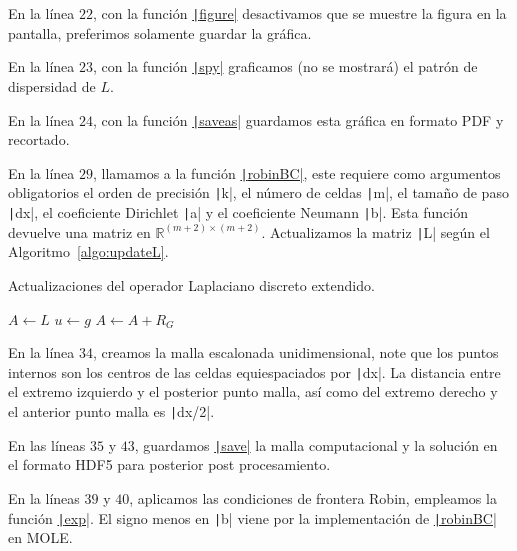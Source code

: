 \begin{problem}
En la línea $22$, con la función
\href{https://docs.octave.org/v9.3.0/Figure-Properties.html#index-figure-visible}{\texttt|figure|}
desactivamos que se muestre la figura en la pantalla, preferimos
solamente guardar la gráfica.

En la línea $23$, con la función
\href{https://docs.octave.org/latest/Information.html#index-spy}{\texttt|spy|}
graficamos (no se mostrará) el patrón de dispersidad de $L$.

En la línea $24$, con la función
\href{https://docs.octave.org/latest/Printing-and-Saving-Plots.html}{\texttt|saveas|}
guardamos esta gráfica en formato PDF y recortado.

En la línea $29$, llamamos a la función
\href{https://carlosal1015.github.io/mole_examples/api_docs/matlab/src/matlab/robinBC.html}{\texttt|robinBC|},
este requiere como argumentos obligatorios el orden de precisión
\texttt|k|, el número  de celdas \texttt|m|,
el tamaño de paso \texttt|dx|, el coeficiente Dirichlet
\texttt|a| y el coeficiente Neumann \texttt|b|.
Esta función devuelve una matriz en
\begin{math}
    \mathbb{R}^{\left(m+2\right)\times\left(m+2\right)}
\end{math}.
Actualizamos la matriz \texttt|L| según el Algoritmo~\ref{algo:updateL}.

\begin{algorithm}[H]
    \caption{Actualizaciones del operador Laplaciano discreto extendido.}\label{algo:updateL}
    $A\leftarrow L$\;
    $u\leftarrow g$\;
    $A\leftarrow A+R_{G}$\;
\end{algorithm}

En la línea $34$, creamos la malla escalonada unidimensional, note
que los puntos internos son los centros de las celdas equiespaciados
por \texttt|dx|.
La distancia entre el extremo izquierdo y el posterior punto malla,
así como del extremo derecho y el anterior punto malla es
\texttt|dx/2|.

En las líneas $35$ y $43$, guardamos
\href{https://docs.octave.org/latest/Simple-File-I_002fO.html#index-save-6}{\texttt|save|}
la malla computacional y la solución en el formato HDF5 para posterior post procesamiento.

En la líneas $39$ y $40$, aplicamos las condiciones de frontera
Robin, empleamos la función \href{https://docs.octave.org/latest/Exponents-and-Logarithms.html#XREFexp}{\texttt|exp|}.
El signo menos en \texttt|b| viene por la implementación
de \href{https://carlosal1015.github.io/mole_examples/api_docs/matlab/src/matlab/robinBC.html}{\texttt|robinBC|}
en MOLE.


\end{problem}
